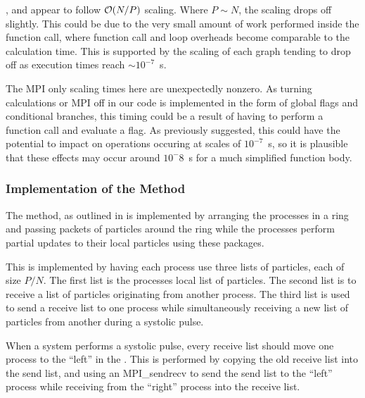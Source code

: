 \vZeroTimeExplanation
    {}
    {}
    {}
    {\individualoperation{}}
    {\systolicloop{}}

,
 and
appear to follow $\mathcal{O}{\left({ N/P }\right)}$ scaling.
%
Where $P \sim{} N$, the scaling drops off slightly.
%
This could be due to the very small amount of work performed
inside the function call, where function call and loop overheads
become comparable to the calculation time.
%
This is supported by the scaling of each graph tending to drop off
as execution times reach $\sim{} 10^{-7}$~s.

The MPI only scaling times here are unexpectedly nonzero.
%
As turning calculations or MPI off in our code is implemented in
the form of global flags and conditional branches, this timing
could be a result of having to perform a function call and
evaluate a flag.
%
As previously suggested, this could have the potential to impact on
operations occuring at scales of $10^{-7}$~s, so it is plausible
that these effects may occur around $10^-{8}$~s for a much simplified
function body.


%
%

\subsubsection{Implementation of the \pairoperation{} Method}

The \pairoperation{} method, as outlined in 
is implemented by arranging the processes in a ring and passing
packets of particles around the ring while the processes perform
partial updates to their local particles using these packages.

This is implemented by having each process use three lists of particles,
each of size $P/N$.
%
The first list is the processes local list of particles.
%
The second list is to receive a list of particles originating from
another process.
%
The third list is used to send a receive list
to one process while simultaneously receiving a new
list of particles from another
during a systolic pulse.

When a system performs a systolic pulse,
every receive list should move one process
to the ``left'' in the \systolicloop{}.
%
This is performed by copying the old receive list into the
send list, and using an MPI\_sendrecv to send the send list to
the ``left'' process while receiving from
the ``right'' process into the receive list.

